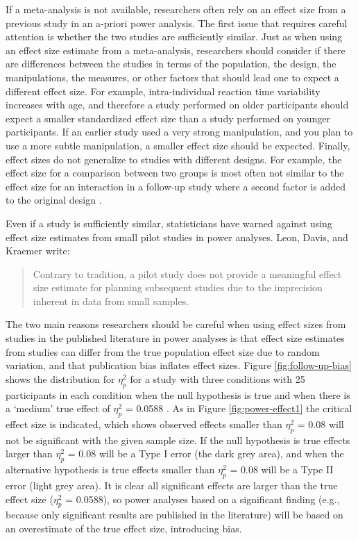 \documentclass[
  oneside]{book}
\begin{document}
If a meta-analysis is not available, researchers often rely on an effect size from a previous study in an a-priori power analysis. The first issue that requires careful attention is whether the two studies are sufficiently similar. Just as when using an effect size estimate from a meta-analysis, researchers should consider if there are differences between the studies in terms of the population, the design, the manipulations, the measures, or other factors that should lead one to expect a different effect size. For example, intra-individual reaction time variability increases with age, and therefore a study performed on older participants should expect a smaller standardized effect size than a study performed on younger participants. If an earlier study used a very strong manipulation, and you plan to use a more subtle manipulation, a smaller effect size should be expected. Finally, effect sizes do not generalize to studies with different designs. For example, the effect size for a comparison between two groups is most often not similar to the effect size for an interaction in a follow-up study where a second factor is added to the original design \citep{lakens_simulation-based_2021}.

Even if a study is sufficiently similar, statisticians have warned against using effect size estimates from small pilot studies in power analyses. Leon, Davis, and Kraemer \citeyearpar{leon_role_2011} write:

\begin{quote}
Contrary to tradition, a pilot study does not provide a meaningful effect size estimate for planning subsequent studies due to the imprecision inherent in data from small samples.
\end{quote}

The two main reasons researchers should be careful when using effect sizes from studies in the published literature in power analyses is that effect size estimates from studies can differ from the true population effect size due to random variation, and that publication bias inflates effect sizes. Figure \ref{fig:follow-up-bias} shows the distribution for \(\eta_p^2\) for a study with three conditions with 25 participants in each condition when the null hypothesis is true and when there is a `medium' true effect of \(\eta_p^2\) = 0.0588 \citep{richardson_eta_2011}. As in Figure \ref{fig:power-effect1} the critical effect size is indicated, which shows observed effects smaller than \(\eta_p^2\) = 0.08 will not be significant with the given sample size. If the null hypothesis is true effects larger than \(\eta_p^2\) = 0.08 will be a Type I error (the dark grey area), and when the alternative hypothesis is true effects smaller than \(\eta_p^2\) = 0.08 will be a Type II error (light grey area). It is clear all significant effects are larger than the true effect size (\(\eta_p^2\) = 0.0588), so power analyses based on a significant finding (e.g., because only significant results are published in the literature) will be based on an overestimate of the true effect size, introducing bias.
\end{document}
